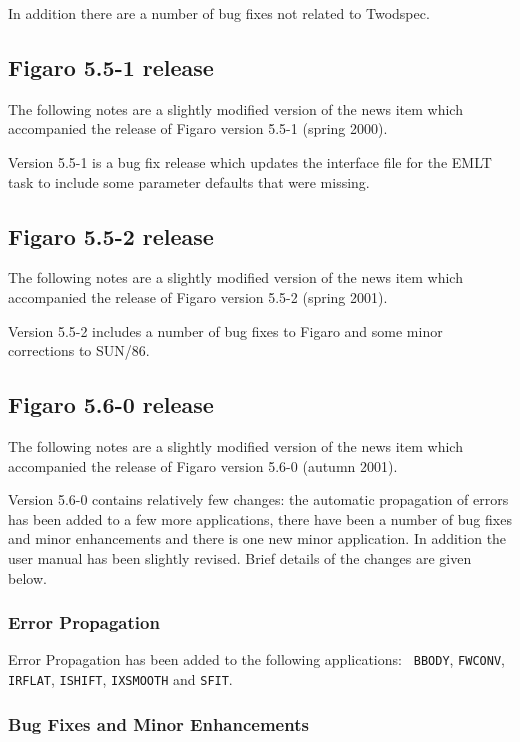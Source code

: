 \documentclass[11pt,twoside]{article}
\begin{document}
 In addition there are a number of bug fixes not related to Twodspec.

\subsection{\label{news551}Figaro 5.5-1 release}

 The following notes are a slightly modified version of the news item
 which accompanied the release of Figaro version 5.5-1 (spring 2000).

 Version 5.5-1 is a bug fix release which updates the interface file for
 the EMLT task to include some parameter defaults that were missing.

\subsection{\label{news552}Figaro 5.5-2 release}

 The following notes are a slightly modified version of the news item
 which accompanied the release of Figaro version 5.5-2 (spring 2001).

 Version 5.5-2 includes a number of bug fixes to Figaro and some minor
 corrections to SUN/86.

\subsection{\label{news560}Figaro 5.6-0 release}

 The following notes are a slightly modified version of the news item
 which accompanied the release of Figaro version 5.6-0 (autumn 2001).

 Version 5.6-0 contains relatively few changes: the automatic propagation
 of errors has been added to a few more applications, there have been a
 number of bug fixes and minor enhancements and there is one new minor
 application.  In addition the user manual has been slightly revised.
 Brief details of the changes are given below.

\subsubsection{Error Propagation}

 Error Propagation has been added to the following applications: {\tt
 BBODY}, {\tt FWCONV}, {\tt IRFLAT}, {\tt ISHIFT}, {\tt IXSMOOTH} and
 {\tt SFIT}.

\subsubsection{Bug Fixes and Minor Enhancements}
\end{document}
